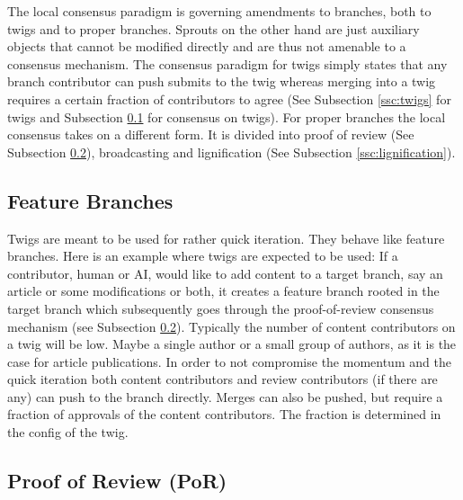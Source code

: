\documentclass[14pt]{article}
\begin{document}
The local consensus paradigm is governing amendments to branches, both to twigs and to proper branches. Sprouts on the other hand are just auxiliary objects that cannot be modified directly and are thus not amenable to a consensus mechanism. The consensus paradigm for twigs simply states that any branch contributor can push submits to the twig whereas merging into a twig requires a certain fraction of contributors to agree (See Subsection \ref{ssc:twigs} for twigs and Subsection \ref{ssc:twiglocalconsensus} for consensus on twigs). For proper branches the local consensus takes on a different form. It is divided into proof of review (See Subsection \ref{ssc:por}), broadcasting and lignification (See Subsection \ref{ssc:lignification}).

\subsection{Feature Branches}
\label{ssc:twiglocalconsensus}

Twigs are meant to be used for rather quick iteration. They behave like feature branches. Here is an example where twigs are expected to be used: If a contributor, human or AI, would like to add content to a target branch, say an article or some modifications or both, it creates a feature branch rooted in the target branch which subsequently goes through the proof-of-review consensus mechanism (see Subsection \ref{ssc:por}). Typically the number of content contributors on a twig will be low. Maybe a single author or a small group of authors, as it is the case for article publications. In order to not compromise the momentum and the quick iteration both content contributors and review contributors (if there are any) can push to the branch directly. Merges can also be pushed, but require a fraction of approvals of the content contributors. The fraction is determined in the config of the twig. 

\subsection{Proof of Review (PoR)}
\label{ssc:por}
\end{document}
